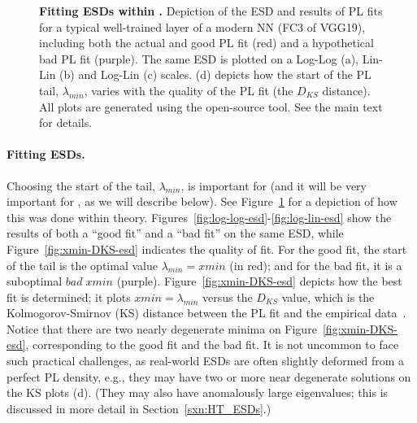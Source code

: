 \begin{figure}[t]
{      \label{fig:xmin-DKS-esd}                                                                                                      
    }                                                                                                                            
    \caption{\textbf{Fitting ESDs within \HTSR.} 
             Depiction of the ESD and results of PL fits for a typical well-trained layer of a modern NN (FC3 of VGG19), including both the actual and good PL fit (red) and a hypothetical bad PL fit (purple). 
             The same ESD is plotted on a Log-Log (a), Lin-Lin (b) and Log-Lin (c) scales.
             (d) depicts how the start of the PL tail, $\lambda_{min}$, varies with the quality of the PL fit (the $D_{KS}$ distance). 
             All plots are generated using the open-source \WW tool. 
             See the main text for details.
            }
  \label{fig:log-esds}
\end{figure}   



\paragraph{Fitting ESDs.}
Choosing the start of the tail, $\lambda_{min}$, is important for \HTSR (and it will be very important for \SETOL, as we will describe below).
See Figure~\ref{fig:log-esds} for a depiction of how this was done within \HTSR theory.
Figures~\ref{fig:log-log-esd}-\ref{fig:log-lin-esd} show the results of both a ``good fit'' and a ``bad fit'' on the same ESD,
while Figure~\ref{fig:xmin-DKS-esd} indicates the quality of fit.
For the good fit, the start of the tail is the optimal value $\lambda_{min}=xmin$ (in red); and for the bad fit, it is a suboptimal $bad\;xmin$ (purple).
Figure~\ref{fig:xmin-DKS-esd} depicts how the best fit is determined; it plots $xmin=\lambda_{min}$ versus the $D_{KS}$ 
value, which is the Kolmogorov-Smirnov (KS) distance between the PL fit and the empirical data~\cite{CSN09_powerlaw}.
Notice that there are two nearly degenerate minima on Figure~\ref{fig:xmin-DKS-esd}, corresponding to the good fit and the bad fit. 
It is not uncommon to face such practical challenges, as real-world ESDs are often slightly deformed from a perfect PL density, e.g.,
they may have two or more near degenerate solutions on the KS plots (d).
(They may also have anomalously large eigenvalues; this is discussed in more detail in Section~\ref{sxn:HT_ESDs}.)

